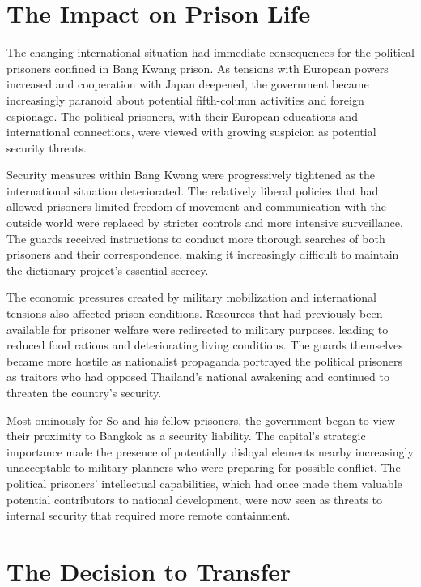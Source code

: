 \documentclass[
  Letterpaper,
]{scrbook}
\begin{document}
\section{The Impact on Prison Life}\label{the-impact-on-prison-life}

The changing international situation had immediate consequences for the
political prisoners confined in Bang Kwang prison. As tensions with
European powers increased and cooperation with Japan deepened, the
government became increasingly paranoid about potential fifth-column
activities and foreign espionage. The political prisoners, with their
European educations and international connections, were viewed with
growing suspicion as potential security threats.

Security measures within Bang Kwang were progressively tightened as the
international situation deteriorated. The relatively liberal policies
that had allowed prisoners limited freedom of movement and communication
with the outside world were replaced by stricter controls and more
intensive surveillance. The guards received instructions to conduct more
thorough searches of both prisoners and their correspondence, making it
increasingly difficult to maintain the dictionary project's essential
secrecy.

The economic pressures created by military mobilization and
international tensions also affected prison conditions. Resources that
had previously been available for prisoner welfare were redirected to
military purposes, leading to reduced food rations and deteriorating
living conditions. The guards themselves became more hostile as
nationalist propaganda portrayed the political prisoners as traitors who
had opposed Thailand's national awakening and continued to threaten the
country's security.

Most ominously for So and his fellow prisoners, the government began to
view their proximity to Bangkok as a security liability. The capital's
strategic importance made the presence of potentially disloyal elements
nearby increasingly unacceptable to military planners who were preparing
for possible conflict. The political prisoners' intellectual
capabilities, which had once made them valuable potential contributors
to national development, were now seen as threats to internal security
that required more remote containment.

\section{The Decision to Transfer}\label{the-decision-to-transfer}
\end{document}
